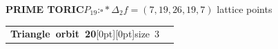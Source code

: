 \documentclass[14pt]{extarticle}
\makeatletter
\newcommand{\AtlasSupportOrbitSplit}[2]{%
  \begin{tabularx}{\linewidth}[t]{%
    @{}>{\raggedright\arraybackslash}p{.37\linewidth}%
    @{\hspace{2.5mm}\AtlasOrbitDivider\hspace{2.5mm}}%
    >{\raggedright\arraybackslash}X@{}}%
    \begin{minipage}[t]{\linewidth}\vspace{0pt}#1\end{minipage} &
    \begin{minipage}[t]{\linewidth}\vspace{0pt}#2\end{minipage}
  \end{tabularx}}
\makeatother
\begin{document}
\begin{atlasbox}\begin{atlaspanel}
\textcolor{toricgreen}{\bfseries PRIME TORIC}\quad \(P_{19}\):\enspace \(\square\ast\Delta_{2}\)\quad \(f=(7,19,26,19,7)\) lattice points
\end{atlaspanel}\end{atlasbox}
\clearpage
\begin{atlaspanel}[top=1mm,bottom=2mm]
\AtlasSupportOrbitSplit{%
\vspace*{-3mm}\mbox{{\LARGE\bfseries Triangle orbit 20}\hspace{3mm}\raisebox{.8mm}[0pt][0pt]{{\fontsize{16}{18}\selectfont\color{muted}size 3}}}%
}{%
\vspace*{-3mm}{\fontsize{13}{16}\selectfont{\color{animalblue}\bfseries\(\mathbb{F}_2\) only}\quad{\color{muted}\(\underline{\{9,\,34,\,52\}}\), \(\{8,\,30,\,53\}\), \(\{10,\,33,\,54\}\)}\rule[-3mm]{0pt}{3mm}}%
}%
\end{atlaspanel}\vspace{2mm}
\end{document}
